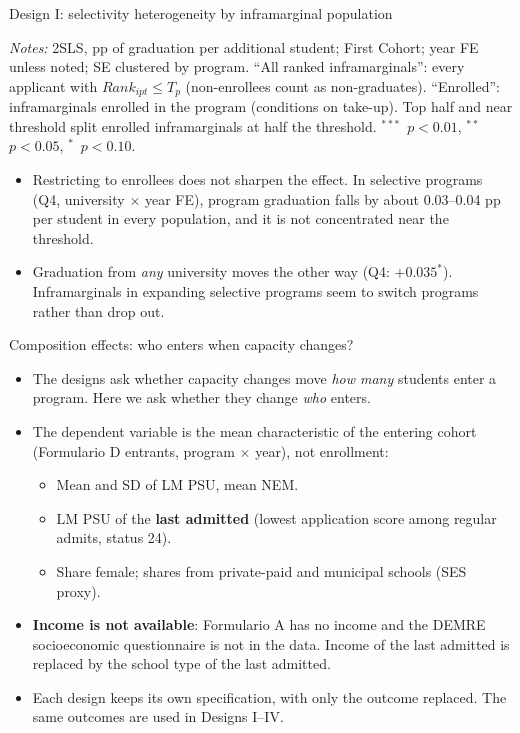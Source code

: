 \documentclass{beamer}
\newcommand{\sym}[1]{\ensuremath{^{#1}}}
\begin{document}
\begin{frame}{Design I: selectivity heterogeneity by inframarginal population}
\centering
\tiny
\resizebox{0.92\textwidth}{!}{}

\vspace{0.06cm}
\parbox{0.97\textwidth}{\tiny
\textit{Notes:} 2SLS, pp of graduation per additional student; First Cohort; year FE unless noted; SE clustered by program. ``All ranked
inframarginals'': every applicant with $Rank_{ipt}\le T_p$ (non-enrollees count as non-graduates). ``Enrolled'': inframarginals enrolled in the
program (conditions on take-up). Top half and near threshold split enrolled inframarginals at half the threshold.
\sym{***}~$p<0.01$, \sym{**}~$p<0.05$, \sym{*}~$p<0.10$.}

\vspace{0.06cm}
\begin{itemize}\tiny
    \setlength{\itemsep}{0pt}
    \item Restricting to enrollees does not sharpen the effect. In selective programs (Q4, university $\times$ year FE), program graduation
    falls by about 0.03--0.04 pp per student in every population, and it is not concentrated near the threshold.
    \item Graduation from \emph{any} university moves the other way (Q4: $+0.035^{*}$). Inframarginals in expanding selective programs seem to
    switch programs rather than drop out.
\end{itemize}
\end{frame}

\begin{frame}{Composition effects: who enters when capacity changes?}
\scriptsize
\begin{itemize}
    \item The designs ask whether capacity changes move \emph{how many} students enter a program. Here we ask whether they change \emph{who} enters.
    \item The dependent variable is the mean characteristic of the entering cohort (Formulario D entrants, program $\times$ year), not enrollment:
    \begin{itemize}
        \item Mean and SD of LM PSU, mean NEM.
        \item LM PSU of the \textbf{last admitted} (lowest application score among regular admits, status 24).
        \item Share female; shares from private-paid and municipal schools (SES proxy).
    \end{itemize}
    \item \textbf{Income is not available}: Formulario A has no income and the DEMRE socioeconomic questionnaire is not in the data.
    Income of the last admitted is replaced by the school type of the last admitted.
    \item Each design keeps its own specification, with only the outcome replaced. The same outcomes are used in Designs I--IV.
\end{itemize}
\end{frame}
\end{document}
